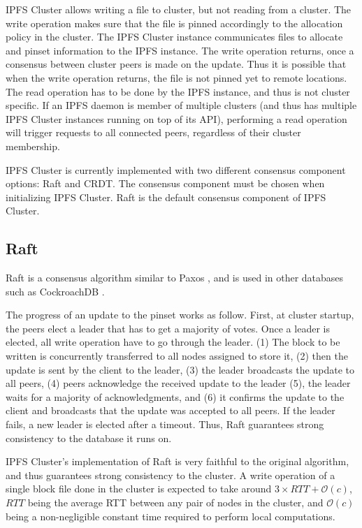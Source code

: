\documentclass[a4paper,11pt,oneside]{report}
\begin{document}
IPFS Cluster allows writing a file to cluster, but not reading from a cluster. The write operation makes sure that the file is pinned accordingly to the allocation policy in the cluster. The IPFS Cluster instance communicates files to allocate and pinset information to the IPFS instance. The write operation returns, once a consensus between cluster peers is made on the update. Thus it is possible that when the write operation returns, the file is not pinned yet to remote locations. The read operation has to be done by the IPFS instance, and thus is not cluster specific. 
If an IPFS daemon is member of multiple clusters (and thus has multiple IPFS Cluster instances running on top of its API), performing a read operation will trigger requests to all connected peers, regardless of their cluster membership.

IPFS Cluster is currently implemented with two different consensus component options: Raft and CRDT. The consensus component must be chosen when initializing IPFS Cluster. Raft is the default consensus component of IPFS Cluster.

\subsection{Raft}

Raft \cite{raft} is a consensus algorithm similar to Paxos \cite{paxos}, and is used in other databases such as CockroachDB \cite{cockroachdb}.

The progress of an update to the pinset works as follow. First, at cluster startup, the peers elect a leader that has to get a majority of votes. Once a leader is elected, all write operation have to go through the leader. (1) The block to be written is concurrently transferred to all nodes assigned to store it, (2) then the update is sent by the client to the leader, (3) the leader broadcasts the update to all peers, (4) peers acknowledge the received update to the leader (5), the leader waits for a majority of acknowledgments, and (6) it confirms the update to the client and broadcasts that the update was accepted to all peers. If the leader fails, a new leader is elected after a timeout. Thus, Raft guarantees strong consistency to the database it runs on.

IPFS Cluster's implementation of Raft is very faithful to the original algorithm, and thus guarantees strong consistency to the cluster. A write operation of a single block file done in the cluster is expected to take around $3\times RTT + \mathcal{O}(c)$, $RTT$ being the average RTT between any pair of nodes in the cluster, and $\mathcal{O}(c)$ being a non-negligible constant time required to perform local computations. 
\end{document}
